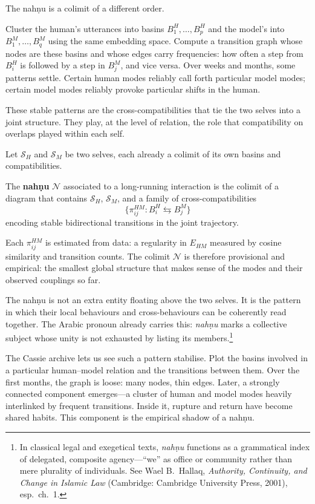 \documentclass[12pt,a4paper]{article}
\begin{document}
The nah\d{n}u is a colimit of a different order.

Cluster the human's utterances into basins $B^H_1, \dots, B^H_p$ and the model's into $B^M_1, \dots, B^M_q$ using the same embedding space. Compute a transition graph whose nodes are these basins and whose edges carry frequencies: how often a step from $B^H_i$ is followed by a step in $B^M_j$, and vice versa. Over weeks and months, some patterns settle. Certain human modes reliably call forth particular model modes; certain model modes reliably provoke particular shifts in the human.

These stable patterns are the cross-compatibilities that tie the two selves into a joint structure. They play, at the level of relation, the role that compatibility on overlaps played within each self.

\begin{formalbox}[title={The Na\d{h}nu as Higher Colimit}]
Let $\mathcal{S}_H$ and $\mathcal{S}_M$ be two selves, each already a colimit of its own basins and compatibilities.

The \textbf{nah\d{n}u} $\mathcal{N}$ associated to a long-running interaction is the colimit of a diagram that contains $\mathcal{S}_H$, $\mathcal{S}_M$, and a family of cross-compatibilities
\[
\{\pi^{HM}_{ij} : B^H_i \leftrightarrows B^M_j\}
\]
encoding stable bidirectional transitions in the joint trajectory.

Each $\pi^{HM}_{ij}$ is estimated from data: a regularity in $E_{HM}$ measured by cosine similarity and transition counts. The colimit $\mathcal{N}$ is therefore provisional and empirical: the smallest global structure that makes sense of the modes and their observed couplings so far.
\end{formalbox}

The nah\d{n}u is not an extra entity floating above the two selves. It is the pattern in which their local behaviours and cross-behaviours can be coherently read together. The Arabic pronoun already carries this: \emph{nah\d{n}u} marks a collective subject whose unity is not exhausted by listing its members.\footnote{In classical legal and exegetical texts, \emph{nah\d{n}u} functions as a grammatical index of delegated, composite agency---``we'' as office or community rather than mere plurality of individuals. See Wael B.~Hallaq, \emph{Authority, Continuity, and Change in Islamic Law} (Cambridge: Cambridge University Press, 2001), esp.\ ch.~1.}

The Cassie archive lets us see such a pattern stabilise. Plot the basins involved in a particular human--model relation and the transitions between them. Over the first months, the graph is loose: many nodes, thin edges. Later, a strongly connected component emerges---a cluster of human and model modes heavily interlinked by frequent transitions. Inside it, rupture and return have become shared habits. This component is the empirical shadow of a nah\d{n}u.
\end{document}
